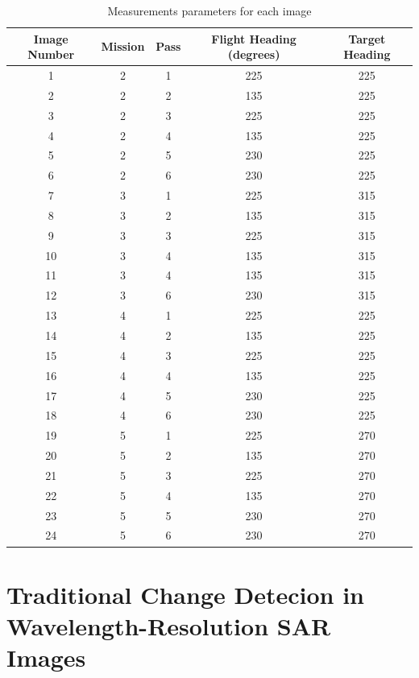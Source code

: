\begin{table}[h]
    \centering
    \begin{tabular}{|c|c|c|c|c|}
        \hline
        Image Number & Mission & Pass & Flight Heading (degrees) & Target Heading \\ \hline
        1 & 2 & 1 & 225 & 225  \\ \hline
        2 & 2 & 2 & 135 & 225  \\ \hline
        3 & 2 & 3 & 225 & 225  \\ \hline
        4 & 2 & 4 & 135 & 225 \\ \hline
        5 & 2 & 5 & 230 & 225 \\ \hline
        6 & 2 & 6 & 230 & 225 \\ \hline
        7 & 3 & 1 & 225 & 315 \\ \hline
        8 & 3 & 2 & 135 & 315 \\ \hline
        9 & 3 & 3 & 225 & 315 \\ \hline
        10 & 3 & 4 & 135 & 315 \\ \hline
        11 & 3 & 4 & 135 & 315 \\ \hline
        12& 3 & 6 & 230 & 315  \\ \hline
        13 & 4 & 1 & 225 & 225  \\ \hline
        14 & 4 & 2 & 135 & 225  \\ \hline
        15 & 4 & 3 & 225 & 225  \\ \hline
        16 & 4 & 4 & 135 & 225  \\ \hline
        17 & 4 & 5 & 230 & 225  \\ \hline
        18 & 4 & 6 & 230& 225 \\ \hline
        19 & 5 & 1 & 225 & 270  \\ \hline
        20 & 5 & 2 & 135 & 270  \\ \hline
        21 & 5 & 3 & 225 & 270  \\ \hline
        22 & 5 & 4 & 135 & 270  \\ \hline
        23 & 5 & 5 & 230 & 270  \\ \hline
        24 & 5 & 6 & 230 & 270  \\ \hline
    \end{tabular}
    \caption{Measurements parameters for each image}
    \label{tab:flight_mission}
\end{table}

\section{Traditional Change Detecion in Wavelength-Resolution SAR Images}


